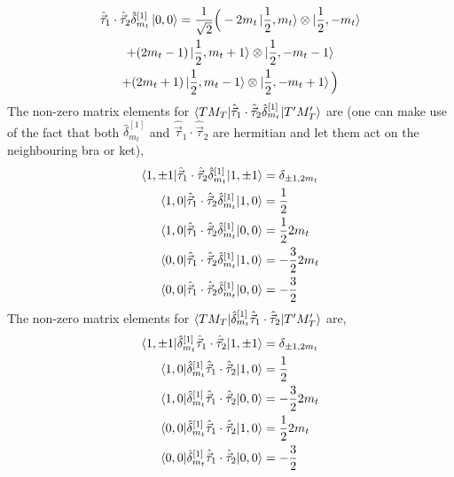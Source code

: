 \documentclass[10pt]{article}
\begin{document}
\begin{multline*}
	\hat{\vec{\tau}}_{1} \cdot \hat{\vec{\tau}}_{2} \hat{\delta}_{m_t}^{[1]} \ket { 0, 0 } = \frac{1}{\sqrt{2}} \Big( - 2m_t \ket{ \frac{1}{2}, m_t} \otimes \ket{ \frac{1}{2}, -m_t} \\
	 + (2m_t-1) \ket{ \frac{1}{2}, m_t + 1} \otimes \ket{ \frac{1}{2},- m_t - 1} \\
	+  (2m_t+1) \ket{ \frac{1}{2}, m_t -1 } \otimes \ket{ \frac{1}{2}, -m_t + 1} \Big) \\
\end{multline*}
The non-zero matrix elements for $ \braket{ T M_T | \hat{\vec{\tau}}_{1} \cdot \hat{\vec{\tau}}_{2} \hat{\delta}_{m_t}^{[1]} | T' M_T'}$ are (one can make use of the fact that both $\hat{\delta}_{m_t}^{[1]}$ and $ \hat{\vec{\tau}}_{1} \cdot \hat{\vec{\tau}}_{2}$ are hermitian and let them act on the neighbouring bra or ket),
\begin{align*}
	\braket{ 1, \pm 1 | \hat{\vec{\tau}}_{1} \cdot \hat{\vec{\tau}}_{2} \hat{\delta}_{m_t}^{[1]} | 1, \pm 1} &= \delta_{ \pm 1,2m_t}  \\
	\braket{ 1,0 | \hat{\vec{\tau}}_{1} \cdot \hat{\vec{\tau}}_{2} \hat{\delta}_{m_t}^{[1]} | 1,0} &= \frac{1}{2} \\
	\braket{ 1,0 | \hat{\vec{\tau}}_{1} \cdot \hat{\vec{\tau}}_{2} \hat{\delta}_{m_t}^{[1]} | 0,0} &= \frac{1}{2}2m_t \\
	\braket{ 0,0 | \hat{\vec{\tau}}_{1} \cdot \hat{\vec{\tau}}_{2} \hat{\delta}_{m_t}^{[1]} | 1,0} &=-\frac{3}{2}2m_t \\
	\braket{ 0,0 | \hat{\vec{\tau}}_{1} \cdot \hat{\vec{\tau}}_{2} \hat{\delta}_{m_t}^{[1]} | 0,0} &=-\frac{3}{2}
\end{align*}
The non-zero matrix elements for $ \braket{ T M_T |  \hat{\delta}_{m_t}^{[1]} \hat{\vec{\tau}}_{1} \cdot \hat{\vec{\tau}}_{2} | T' M_T'}$ are,
\begin{align*}
	\braket{ 1, \pm 1 | \hat{\delta}_{m_t}^{[1]} \hat{\vec{\tau}}_{1} \cdot \hat{\vec{\tau}}_{2} | 1, \pm 1} &= \delta_{ \pm 1,2m_t}  \\
	\braket{ 1,0 | \hat{\delta}_{m_t}^{[1]} \hat{\vec{\tau}}_{1} \cdot \hat{\vec{\tau}}_{2} | 1,0} &= \frac{1}{2} \\
	\braket{ 1,0 | \hat{\delta}_{m_t}^{[1]} \hat{\vec{\tau}}_{1} \cdot \hat{\vec{\tau}}_{2} | 0,0} &=-\frac{3}{2} 2m_t \\
	\braket{ 0,0 | \hat{\delta}_{m_t}^{[1]} \hat{\vec{\tau}}_{1} \cdot \hat{\vec{\tau}}_{2} | 1,0} &= \frac{1}{2} 2m_t \\
	\braket{ 0,0 | \hat{\delta}_{m_t}^{[1]} \hat{\vec{\tau}}_{1} \cdot \hat{\vec{\tau}}_{2} | 0,0} &=-\frac{3}{2}
\end{align*}
\end{document}
